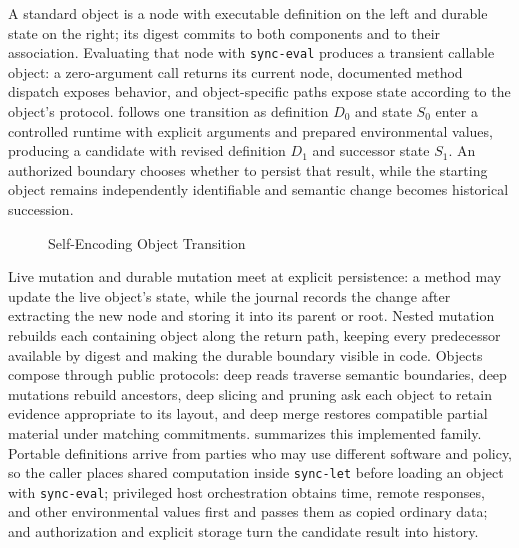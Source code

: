 A standard object is a node with executable definition on the left and durable state on the right; its digest commits to both components and to their association. Evaluating that node with \texttt{sync-eval} produces a transient callable object: a zero-argument call returns its current node, documented method dispatch exposes behavior, and object-specific paths expose state according to the object's protocol.  follows one transition as definition $D_0$ and state $S_0$ enter a controlled runtime with explicit arguments and prepared environmental values, producing a candidate with revised definition $D_1$ and successor state $S_1$. An authorized boundary chooses whether to persist that result, while the starting object remains independently identifiable and semantic change becomes historical succession.

\begin{figure}[htbp]
  \centering
  \resizebox{\textwidth}{!}{}
  \caption{Self-Encoding Object Transition}
  \label{fig:self-encoding-transition}
\end{figure}

Live mutation and durable mutation meet at explicit persistence: a method may update the live object's state, while the journal records the change after extracting the new node and storing it into its parent or root. Nested mutation rebuilds each containing object along the return path, keeping every predecessor available by digest and making the durable boundary visible in code. Objects compose through public protocols: deep reads traverse semantic boundaries, deep mutations rebuild ancestors, deep slicing and pruning ask each object to retain evidence appropriate to its layout, and deep merge restores compatible partial material under matching commitments.  summarizes this implemented family. Portable definitions arrive from parties who may use different software and policy, so the caller places shared computation inside \texttt{sync-let} before loading an object with \texttt{sync-eval}; privileged host orchestration obtains time, remote responses, and other environmental values first and passes them as copied ordinary data; and authorization and explicit storage turn the candidate result into history.

\begin{table}[htbp]
  \centering
  \small
  
  \caption{Deep Object Operations}
  \label{tab:deep-operations}
\end{table}

